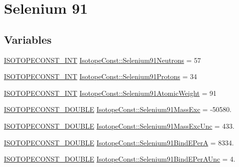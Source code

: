 \hypertarget{group___isotope_const-_selenium-_se91}{}\section{Selenium 91}
\label{group___isotope_const-_selenium-_se91}
\subsection*{Variables}
\begin{DoxyCompactItemize}
\item 
\mbox{\hyperlink{group___isotope_const-_macros_ga5f18360b3e99483a35c32d789e62621c}{I\+S\+O\+T\+O\+P\+E\+C\+O\+N\+S\+T\+\_\+\+I\+NT}} \mbox{\hyperlink{group___isotope_const-_selenium-_se91_ga95e8eee414bb94d27e5e46e9c879ec36}{Isotope\+Const\+::\+Selenium91\+Neutrons}} = 57
\item 
\mbox{\hyperlink{group___isotope_const-_macros_ga5f18360b3e99483a35c32d789e62621c}{I\+S\+O\+T\+O\+P\+E\+C\+O\+N\+S\+T\+\_\+\+I\+NT}} \mbox{\hyperlink{group___isotope_const-_selenium-_se91_ga7b61b1d472fbc415a7780bb1c7ccba07}{Isotope\+Const\+::\+Selenium91\+Protons}} = 34
\item 
\mbox{\hyperlink{group___isotope_const-_macros_ga5f18360b3e99483a35c32d789e62621c}{I\+S\+O\+T\+O\+P\+E\+C\+O\+N\+S\+T\+\_\+\+I\+NT}} \mbox{\hyperlink{group___isotope_const-_selenium-_se91_ga69bd38b199e502b53de687e605c9f7b4}{Isotope\+Const\+::\+Selenium91\+Atomic\+Weight}} = 91
\item 
\mbox{\hyperlink{group___isotope_const-_macros_ga8f45a7272ce02c0b4c65c44636ed719a}{I\+S\+O\+T\+O\+P\+E\+C\+O\+N\+S\+T\+\_\+\+D\+O\+U\+B\+LE}} \mbox{\hyperlink{group___isotope_const-_selenium-_se91_ga5e61faf6119540799674397265cfe62d}{Isotope\+Const\+::\+Selenium91\+Mass\+Exc}} = -\/50580.
\item 
\mbox{\hyperlink{group___isotope_const-_macros_ga8f45a7272ce02c0b4c65c44636ed719a}{I\+S\+O\+T\+O\+P\+E\+C\+O\+N\+S\+T\+\_\+\+D\+O\+U\+B\+LE}} \mbox{\hyperlink{group___isotope_const-_selenium-_se91_ga9c77586e3008dcaa1fc6c2172e4285a4}{Isotope\+Const\+::\+Selenium91\+Mass\+Exc\+Unc}} = 433.
\item 
\mbox{\hyperlink{group___isotope_const-_macros_ga8f45a7272ce02c0b4c65c44636ed719a}{I\+S\+O\+T\+O\+P\+E\+C\+O\+N\+S\+T\+\_\+\+D\+O\+U\+B\+LE}} \mbox{\hyperlink{group___isotope_const-_selenium-_se91_gad886341e2158619b760d48f70bd87784}{Isotope\+Const\+::\+Selenium91\+Bind\+E\+PerA}} = 8334.
\item 
\mbox{\hyperlink{group___isotope_const-_macros_ga8f45a7272ce02c0b4c65c44636ed719a}{I\+S\+O\+T\+O\+P\+E\+C\+O\+N\+S\+T\+\_\+\+D\+O\+U\+B\+LE}} \mbox{\hyperlink{group___isotope_const-_selenium-_se91_ga82c29bc6dbc2bac17c04bc0f7c26ff8a}{Isotope\+Const\+::\+Selenium91\+Bind\+E\+Per\+A\+Unc}} = 4.

\end{DoxyCompactItemize}
